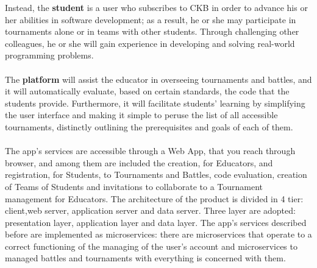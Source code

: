 Instead, the \textbf{student} is a user who subscribes to CKB in order to advance his or her abilities in software development; as a result, he or she may participate in tournaments alone or in teams with other students. Through challenging 
other colleagues, he or she will gain experience in developing and solving real-world programming problems.\\
\\
The \textbf{platform} will assist the educator in overseeing tournaments and battles, and it will automatically evaluate, based on certain standards, the code that the students provide. Furthermore, it will facilitate students' learning by 
simplifying the user interface and making it simple to peruse the list of all accessible tournaments, distinctly outlining the prerequisites and goals of each of them.\\
\\
The app's services are accessible through a Web App, that you reach through browser, and among them are included the creation, for Educators, and registration, for Students, to Tournaments and Battles, code evaluation, creation of Teams of Students and invitations 
to collaborate to a Tournament management for Educators. 
The architecture of the product is divided in 4 tier: client,web server, application server and data server. Three layer are adopted: presentation layer, application layer and data layer.
The app's services described before are implemented as microservices: there are microservices that operate to a correct functioning of the managing of the user's account and microservices to managed
battles and tournaments with everything is concerned with them.

